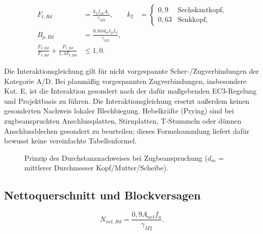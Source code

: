 \documentclass[10pt,a4paper]{article}
\begin{document}
\begin{align}
F_{t,Rd} &= \frac{k_2 f_{ub} A_s}{\gamma_{M2}}, &
 k_2&=\begin{cases}0{,}9 & \text{Sechskantkopf},\\0{,}63&\text{Senkkopf},\end{cases}\\[1mm]
B_{p,Rd} &= \frac{0{,}6\pi d_m t_p f_u}{\gamma_{M2}},\\[1mm]
\frac{F_{v,Ed}}{F_{v,Rd}}+\frac{F_{t,Ed}}{1{,}4F_{t,Rd}}&\leq 1{,}0.
\end{align}

\begin{hinweisbox}
Die Interaktionsgleichung gilt für nicht vorgespannte Scher-/Zugverbindungen der Kategorie A/D. Bei planmäßig vorgespannten Zugverbindungen, insbesondere Kat. E, ist die Interaktion gesondert nach der dafür maßgebenden EC3-Regelung und Projektbasis zu führen. Die Interaktionsgleichung ersetzt außerdem keinen gesonderten Nachweis lokaler Blechbiegung. Hebelkräfte (Prying) sind bei zugbeanspruchten Anschlussplatten, Stirnplatten, T-Stummeln oder dünnen Anschlussblechen gesondert zu beurteilen; dieses Formelsammlung liefert dafür bewusst keine vereinfachte Tabellenformel.
\end{hinweisbox}


\begin{figure}[H]
\centering
{}
\caption{Prinzip des Durchstanznachweises bei Zugbeanspruchung ($d_m$ = mittlerer Durchmesser Kopf/Mutter/Scheibe).}
\end{figure}

\subsection{Nettoquerschnitt und Blockversagen}
\begin{equation}
N_{net,Rd} = \frac{0{,}9 A_{net} f_u}{\gamma_{M2}}.
\end{equation}
\end{document}
